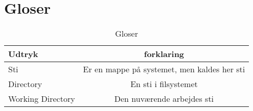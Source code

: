 \chapter{Gloser}
\label{app:gloser}
\begin{table}[h]
  \centering
  \begin{tabular}{|l|c|}
    Udtryk & forklaring \\
    \hline
    Sti & Er en mappe på systemet, men kaldes her sti \\
    \hline
    Directory & En sti i filsystemet \\
    \hline
    Working Directory & Den nuværende arbejdes sti \\
    \hline
  \end{tabular}
  \caption{Gloser}
\end{table}
